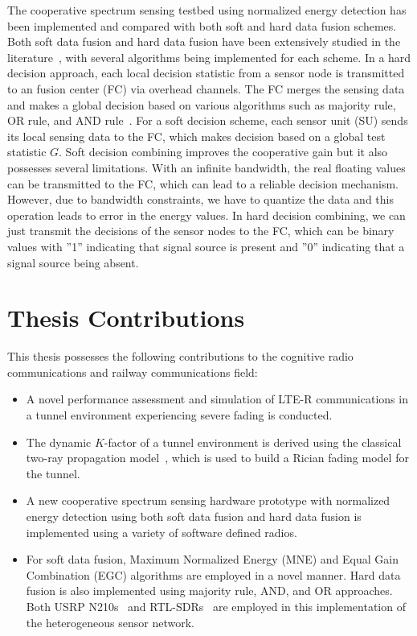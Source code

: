 The cooperative spectrum sensing testbed using normalized energy detection has been implemented and compared with both soft and hard data fusion schemes. Both soft data fusion and hard data fusion have been extensively studied in the literature~\cite{arhtn9,inphtn10,arhtn11}, with several algorithms being implemented for each scheme. In a hard decision approach, each local decision statistic from a sensor node is transmitted to an fusion center (FC) via overhead channels. The FC merges the sensing data and makes a global decision based on various algorithms such as majority rule, OR rule, and AND rule~\cite{inhtn12}. For a soft decision scheme, each sensor unit (SU) sends its local sensing data to the FC, which makes decision based on a global test statistic $G$. Soft decision combining improves the cooperative gain but it also possesses several limitations. With an infinite bandwidth, the real floating values can be transmitted to the FC, which can lead to a reliable decision mechanism. However, due to bandwidth constraints, we have to quantize the data and this operation leads to error in the energy values. In hard decision combining, we can just transmit the decisions of the sensor nodes to the FC, which can be binary values with ''1'' indicating that signal source is present and ''0'' indicating that a signal source being absent.
\section{Thesis Contributions}
This thesis possesses the following contributions to the cognitive radio communications and railway communications field:

\begin{itemize}
\item A novel performance assessment and simulation of LTE-R communications in a tunnel environment experiencing severe fading is conducted.

\item The dynamic $K$-factor of a tunnel environment is derived using the classical two-ray propagation model~\cite{booklter11}, which is used to build a Rician fading model for the tunnel.

\item A new cooperative spectrum sensing hardware prototype with normalized energy detection using both soft data fusion and hard data fusion is implemented using a variety of software defined radios.

\item For soft data fusion, Maximum Normalized Energy (MNE) and Equal Gain Combination (EGC) algorithms are employed in a novel manner. Hard data fusion is also implemented using majority rule, AND, and OR approaches. Both USRP N210s~\cite{usrp} and RTL-SDRs~\cite{rtlsdr} are employed in this implementation of the heterogeneous sensor network.
\end{itemize}


